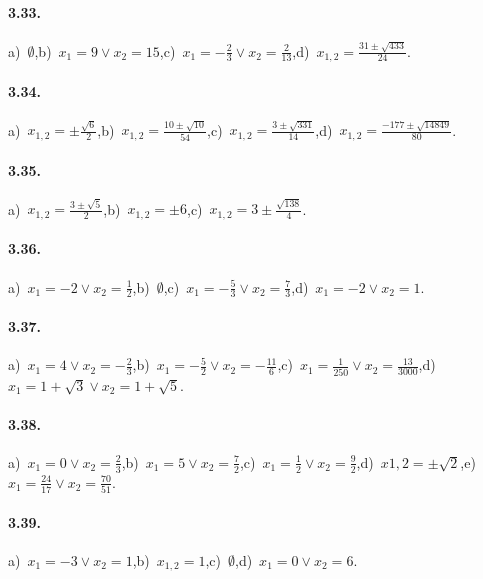 \paragraph{3.33.} a)~$\emptyset$,\quad b)~$x_{1} = 9 \vee x_{2} = 15$,\quad c)~$x_{1} =-\frac{2}{3} \vee x_{2} = \frac{2}{13}$,\quad d)~$x_{1,2} = \frac{31 \pm \sqrt{433}}{24}$.

\paragraph{3.34.} a)~$x_{1,2} = \pm \frac{\sqrt{6}}{2}$,\quad b)~$x_{1,2} = \frac{10 \pm \sqrt{10}}{54}$,\quad c)~$x_{1,2} = \frac{3 \pm \sqrt{331}}{14}$,\quad d)~$x_{1,2} = \frac{- 177 \pm \sqrt{14849}}{80}$.

\paragraph{3.35.} a)~$x_{1,2} = \frac{3 \pm \sqrt{5}}{2}$,\quad b)~$x_{1,2} =\pm 6$,\quad c)~$x_{1,2} = 3 \pm \frac{\sqrt{138}}{4}$.

\paragraph{3.36.} a)~$x_{1} =-2 \vee x_{2} = \frac{1}{2}$,\quad b)~$\emptyset$,\quad c)~$x_1=-\frac{5}{3} \vee x_2=\frac{7}{3}$,\quad d)~$x_1=-2 \vee x_2=1$.

\paragraph{3.37.} a)~$x_{1} = 4 \vee x_{2} =-\frac{2}{3}$,\quad b)~$x_{1} =-\frac{5}{2} \vee x_{2} =-\frac{11}{6}$,\quad c)~$x_{1} =\frac{1}{250} \vee x_{2} =\frac{13}{3000}$,\quad d)~$x_{1} = 1 + \sqrt{3} \vee x_{2} = 1 + \sqrt{5}$.

\paragraph{3.38.} a)~$x_{1} =0 \vee x_{2} =\frac{2}{3}$,\quad b)~$x_{1} = 5 \vee x_{2} = \frac{7}{2}$,\quad c)~$x_{1} =\frac{1}{2} \vee x_{2} =\frac{9}{2}$,\quad d)~$x{1,2}= \pm \sqrt{2}$,\quad e)~$x_{1} = \frac{24}{17} \vee x_{2} = \frac{70}{51}$.

\paragraph{3.39.} a)~$x_{1} =-3 \vee x_{2} = 1$,\quad b)~$x_{1,2}= 1$,\quad c)~$\emptyset$,\quad d)~$x_{1} = 0 \vee x_{2} = 6$.

